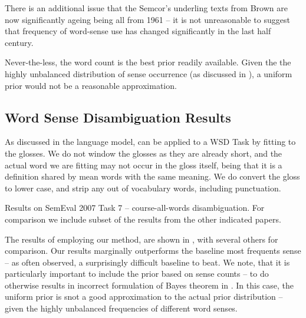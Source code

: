 \documentclass{sig-alternate}
\begin{document}
There is an additional issue that the Semcor's underling texts from Brown are now significantly ageing being all from 1961 \cite{francis1979brown} -- it is not unreasonable to suggest that frequency of word-sense use has changed significantly in the last half century.

Never-the-less, the word count is the best prior readily available. Given the the highly unbalanced distribution of sense occurrence (as discussed in ),
a uniform prior would not be a reasonable approximation.




\subsection{Word Sense Disambiguation Results}

As discussed in  the language model, can be applied to a WSD Task by fitting to the glosses. We do not window the glosses as they are already short, and the actual word we are fitting may not occur in the gloss itself, being that it is a definition shared by mean words with the same meaning. We do convert the gloss to lower case, and strip any out of vocabulary words, including punctuation.

\begin{table*}
	\begin{adjustbox}{max width=\textwidth}
	\end{adjustbox}

	\caption{Results on SemEval 2007 Task 7 -- course-all-words disambiguation.
		For comparison we include subset of the results from the other indicated papers.
	} \label{samevalres}
\end{table*}

The results of employing our method, are shown in , with several others for comparison. Our results marginally outperforms the baseline most frequents sense -- as often observed, a surprisingly difficult baseline to beat.
We note, that it is particularly important to include the prior based on sense counts -- to do otherwise results in incorrect formulation of Bayes theorem in . In this case, the uniform prior is snot a good approximation to the actual prior distribution -- given the highly unbalanced frequencies of different word senses. 
\end{document}
